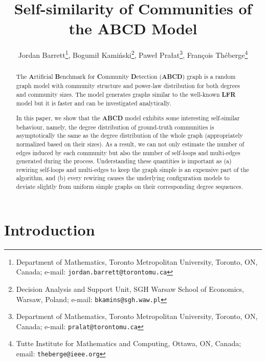 \documentclass[12pt]{article}
\theoremstyle{definition}
\theoremstyle{remark}
\theoremstyle{remark}
\numberwithin{theorem}{section}
\begin{document}
\title{Self-similarity of Communities of the ABCD Model}

\author{
Jordan Barrett\thanks{Department of Mathematics, Toronto Metropolitan University, Toronto, ON, Canada; e-mail: \texttt{jordan.barrett@torontomu.ca}}, 
Bogumi\l{} Kami\'{n}ski\thanks{Decision Analysis and Support Unit, SGH Warsaw School of Economics, Warsaw, Poland; e-mail: \texttt{bkamins@sgh.waw.pl}}, 
Pawe\l{} Pra\l{}at\thanks{Department of Mathematics, Toronto Metropolitan University, Toronto, ON, Canada; e-mail: \texttt{pralat@torontomu.ca}}, 
Fran\c{c}ois Th\'{e}berge\thanks{Tutte Institute for Mathematics and Computing, Ottawa, ON, Canada; email: \texttt{theberge@ieee.org}}
}

\maketitle

\begin{abstract}
The \textbf{A}rtificial \textbf{B}enchmark for \textbf{C}ommunity \textbf{D}etection (\textbf{ABCD}) graph is a random graph model with community structure and power-law distribution for both degrees and community sizes. The model generates graphs similar to the well-known \textbf{LFR} model but it is faster and can be investigated analytically.

In this paper, we show that the \textbf{ABCD} model exhibits some interesting self-similar behaviour, namely, the degree distribution of ground-truth communities is asymptotically the same as the degree distribution of the whole graph (appropriately normalized based on their sizes). As a result, we can not only estimate the number of edges induced by each community but also the number of self-loops and multi-edges generated during the process. Understanding these quantities is important as (a) rewiring self-loops and multi-edges to keep the graph simple is an expensive part of the algorithm, and (b) every rewiring causes the underlying configuration models to deviate slightly from uniform simple graphs on their corresponding degree sequences.
\end{abstract}

\section{Introduction}\label{sec:intro} 
\end{document}
